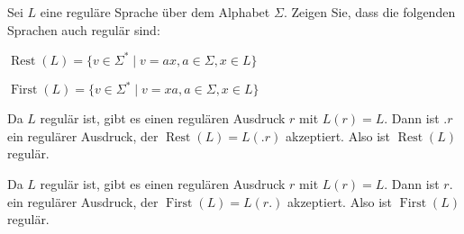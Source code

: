 Sei $L$ eine reguläre Sprache über dem Alphabet $\Sigma$.
Zeigen Sie, dass die folgenden Sprachen auch regulär sind:
\begin{teilaufgaben}
\item $\operatorname{Rest}(L)=\{v \in\Sigma^*\;|\; v=ax, a\in\Sigma, x\in L\}$
\item $\operatorname{First}(L)=\{v \in\Sigma^*\;|\; v=xa, a\in\Sigma, x\in L\}$
\end{teilaufgaben}


\begin{loesung}
\begin{teilaufgaben}
\item Da $L$ regulär ist, gibt es einen regulären Ausdruck $r$ mit
$L(r)=L$. Dann ist $.r$ ein regulärer Ausdruck, der
$\operatorname{Rest}(L)=L(.r)$ akzeptiert.
Also ist
$\operatorname{Rest}(L)$ regulär.
\item Da $L$ regulär ist, gibt es einen regulären Ausdruck $r$ mit
$L(r)=L$. Dann ist $r.$ ein regulärer Ausdruck, der
$\operatorname{First}(L)=L(r.)$ akzeptiert. Also ist
$\operatorname{First}(L)$ regulär.
\qedhere
\end{teilaufgaben}
\end{loesung}

